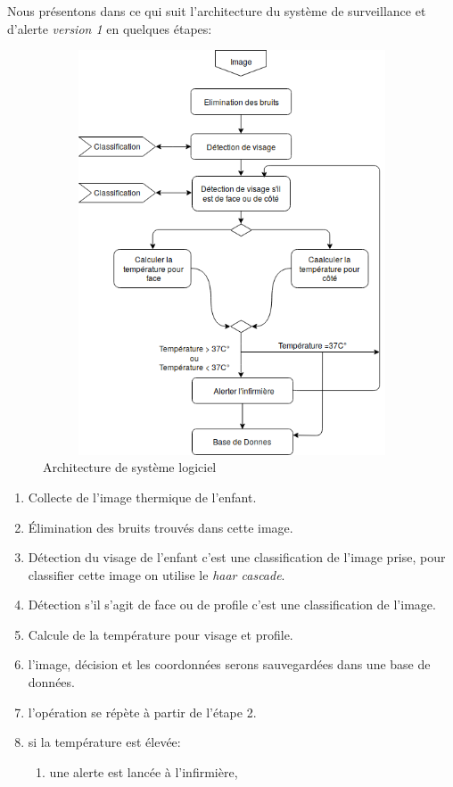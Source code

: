 \documentclass[12pt]{article}
\begin{document}
Nous présentons dans ce qui suit l'architecture du système de surveillance et d'alerte \textit{version 1}  en quelques étapes:
\newpage
\begin{figure}[h]
	\centering
	\includegraphics[height=12cm,width=12cm]{img-Chapiter-3/Picture1.png}
	\caption{Architecture de système logiciel}
	\label{fig:achdelasolu}
\end{figure}
\begin{enumerate}
	\item Collecte de l’image thermique de l’enfant.
	\item \' Elimination des bruits trouvés dans cette image.
	\item Détection du visage de l’enfant c'est une classification de l’image prise, pour classifier cette image on utilise le \textit{haar cascade}.
	\item Détection s’il s’agit  de face ou de profile c'est une classification de l’image.
	\item Calcule de la température pour visage et profile. 
	\item l'image, décision et les coordonnées serons sauvegardées dans une base de données. 
	\item l’opération se répète à partir de  l’étape 2.
	\item si la température est élevée:
	\begin{enumerate}
		\item une alerte est lancée à l’infirmière,
	\end{enumerate}
\end{enumerate}
\end{document}
